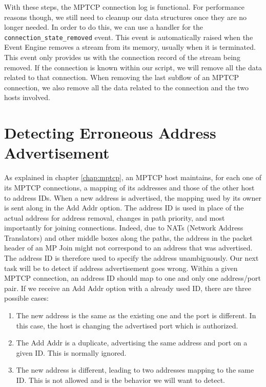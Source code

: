 With these steps, the MPTCP connection log is functional. For performance reasons though, we still need to cleanup our data structures once they are no longer needed. In order to do this, we can use a handler for the \texttt{connection\_state\_removed} event. This event is automatically raised when the Event Engine removes a stream from its memory, usually when it is terminated. This event only provides us with the connection record of the stream being removed. If the connection is known within our script, we will remove all the data related to that connection. When removing the last subflow of an MPTCP connection, we also remove all the data related to the connection and the two hosts involved.


\section{Detecting Erroneous Address Advertisement} \label{section:add addr log}
As explained in chapter \ref{chap:mptcp}, an MPTCP host maintains, for each one of its MPTCP connections, a mapping of its addresses and those of the other host to address IDs. When a new address is advertised, the mapping used by its owner is sent along in the Add Addr option. The address ID is used in place of the actual address for address removal, changes in path priority, and most importantly for joining connections. Indeed, due to NATs (Network Address Translators) and other middle boxes along the paths, the address in the packet header of an MP Join might not correspond to an address that was advertised. The address ID is therefore used to specify the address unambiguously. Our next task will be to detect if address advertisement goes wrong. Within a given MPTCP connection, an address ID should map to one and only one address/port pair. If we receive an Add Addr option with a already used ID, there are three possible cases: \\

\begin{enumerate}
\item The new address is the same as the existing one and the port is different. In this case, the host is changing the advertised port which is authorized.
\item The Add Addr is a duplicate, advertising the same address and port on a given ID. This is normally ignored.
\item The new address is different, leading to two addresses mapping to the same ID. This is not allowed and is the behavior we will want to detect.
\end{enumerate} 

